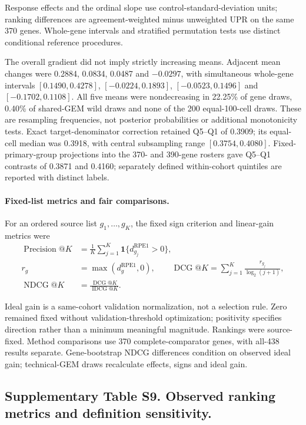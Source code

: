 \documentclass[a4paper,fleqn]{cas-sc}
\makeatletter
\DeclareRobustCommand{\rev}[1]{{\color{red}\def\@citecolor{black}\def\@linkcolor{red}\def\@urlcolor{red}#1}}
\makeatother
\begin{document}
\rev{Response effects and the ordinal slope use control-standard-deviation units; ranking differences are agreement-weighted minus unweighted UPR on the same 370 genes.} \rev{Whole-gene intervals and stratified permutation tests use distinct conditional reference procedures.}

\rev{The overall gradient did not imply strictly increasing means.} \rev{Adjacent mean changes were 0.2884, 0.0834, 0.0487 and $-0.0297$, with simultaneous whole-gene intervals $[0.1490,0.4278]$, $[-0.0224,0.1893]$, $[-0.0523,0.1496]$ and $[-0.1702,0.1108]$.} \rev{All five means were nondecreasing in 22.25\% of gene draws, 0.40\% of shared-GEM wild draws and none of the 200 equal-100-cell draws.} \rev{These are resampling frequencies, not posterior probabilities or additional monotonicity tests.} \rev{Exact target-denominator correction retained Q5--Q1 of 0.3909; its equal-cell median was 0.3918, with central subsampling range $[0.3754,0.4080]$.} \rev{Fixed-primary-group projections into the 370- and 390-gene rosters gave Q5--Q1 contrasts of 0.3871 and 0.4160; separately defined within-cohort quintiles are reported with distinct labels.}

\paragraph{\rev{Fixed-list metrics and fair comparisons.}}
\rev{For an ordered source list $g_1,\ldots,g_K$, the fixed sign criterion and linear-gain metrics were
{}
{}
{\color{red}
\begin{align*}
\operatorname{Precision}@K&=\frac{1}{K}\sum_{j=1}^{K}\mathbf{1}\{d_{g_j}^{\mathrm{RPE1}}>0\},\\
r_g&=\max(d_g^{\mathrm{RPE1}},0),\qquad
\operatorname{DCG}@K=\sum_{j=1}^{K}\frac{r_{g_j}}{\log_2(j+1)},\\
\operatorname{NDCG}@K&=\frac{\operatorname{DCG}@K}{\operatorname{IDCG}@K}.
\end{align*}
}
}

\rev{Ideal gain is a same-cohort validation normalization, not a selection rule.} \rev{Zero remained fixed without validation-threshold optimization; positivity specifies direction rather than a minimum meaningful magnitude.} \rev{Rankings were source-fixed.} \rev{Method comparisons use 370 complete-comparator genes, with all-438 results separate.} \rev{Gene-bootstrap NDCG differences condition on observed ideal gain; technical-GEM draws recalculate effects, signs and ideal gain.}

\subsection*{\rev{Supplementary Table S9. Observed ranking metrics and definition sensitivity.}}
\end{document}
